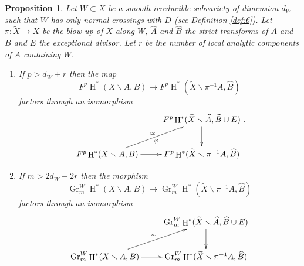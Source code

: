 \documentclass[11pt,a4paper]{amsart}
\DeclareMathOperator {\Gr} {Gr}
\DeclareMathOperator{\rH}{H}
\numberwithin{equation}{section}
\theoremstyle{plain}
\newtheorem{prop}{Proposition}[section]
\theoremstyle{definition}
\begin{document}
\begin{prop} \label{prop:2}
  Let $W\subset X$ be a smooth irreducible subvariety of
  dimension $d_{W}$ such that $W$
  has only normal crossings with $D$ (see
  Definition \ref{def:6}). Let $\pi \colon \widetilde X\to X$ be
  the blow up of  $X$ along $W$, $\widehat A$ and $\widehat B$ the
  strict transforms of $A$ and $B$ and $E$ the exceptional
  divisor. Let $r$ be the number of local analytic components of $A$ containing
  $W$.
  \begin{enumerate}
  \item\label{item:3} If $p>d_{W}+r$ then the map
    \begin{displaymath}
      F^{p}\rH^{\ast}(X\smallsetminus A,B)\longrightarrow
      F^{p}\rH^{\ast}(\widetilde X\smallsetminus \pi ^{-1} A,\widehat
      B) 
    \end{displaymath}
    factors through an isomorphism 
    \begin{displaymath}
      \xymatrix{
       &F^{p}\rH^{\ast}(\widetilde X\smallsetminus \widehat A,
        \widehat B\cup E)\ar[d]\\
        F^{p}\rH^{\ast}(X\smallsetminus A,B)\ar[r]\ar^{\simeq}_{\varphi}[ru]
        &F^{p}\rH^{\ast}(\widetilde X\smallsetminus \pi ^{-1}A,\widehat B)
      }.
    \end{displaymath}
  \item \label{item:4} If $m>2d_{W}+2r$ then the morphism 
    \begin{displaymath}
      \Gr^{W}_{m}\rH^{\ast}(X\smallsetminus A,B)\longrightarrow
      \Gr^{W}_{m}\rH^{\ast}(\widetilde X\smallsetminus \pi ^{-1} A,\widehat B)
    \end{displaymath}
    factors through an isomorphism
    \begin{displaymath}
      \xymatrix{
        &\Gr^{W}_{m}\rH^{\ast}(\widetilde X\smallsetminus \widehat A,
        \widehat B\cup E)\ar[d]\\
        \Gr^{W}_{m}\rH^{\ast}(X\smallsetminus A,B)\ar[r]\ar^{\simeq}[ru]
        &\Gr^{W}_{m}\rH^{\ast}(\widetilde X\smallsetminus \pi ^{-1} A,
        \widehat B)
      }
    \end{displaymath}
  \end{enumerate}
 \end{prop}
\end{document}
